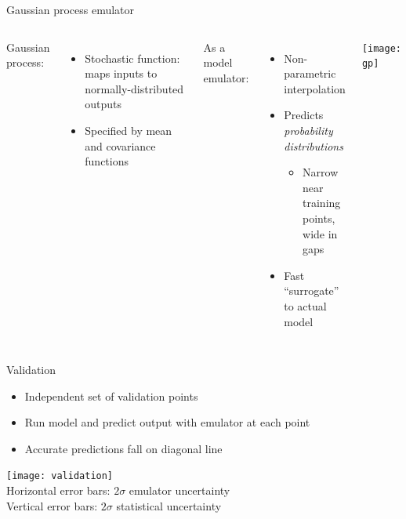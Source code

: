 \documentclass{beamer}
\begin{document}
\begin{frame}{Gaussian process emulator}
  \vspace{1em}
  \begin{columns}[c]
    Gaussian process:
    \begin{itemize}
      \item Stochastic function: maps inputs to normally-distributed outputs
      \item Specified by mean and covariance functions
    \end{itemize}
    \bigskip
    As a model emulator:
    \begin{itemize}
      \item Non-parametric interpolation
      \item Predicts \emph{probability distributions}
        \begin{itemize}
          \item Narrow near training points, \\ wide in gaps
        \end{itemize}
      \item Fast ``surrogate'' to actual model
    \end{itemize}
    \texttt{[image: gp]}
  \end{columns}
\end{frame}


\begin{frame}{Validation}
  \begin{itemize}
    \item Independent set of validation points
    \item Run model and predict output with emulator at each point
    \item Accurate predictions fall on diagonal line
  \end{itemize}
  \medskip
  \texttt{[image: validation]} \\[1em]
  \scriptsize
  \hspace{2em} Horizontal error bars: $2\sigma$ emulator uncertainty \\
  \hspace{2em} Vertical error bars: $2\sigma$ statistical uncertainty
\end{frame}
\end{document}
